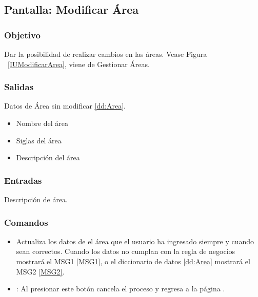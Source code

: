 \subsection{Pantalla: Modificar Área}

\subsubsection{Objetivo}
Dar la posibilidad de realizar cambios en las áreas. Vease Figura ~\ref{IUModificarArea}, viene de Gestionar Áreas.


\subsubsection{Salidas}
Datos de Área sin modificar \ref{dd:Area}.
\begin{itemize}
 \item Nombre del área
 \item Siglas del área
 \item Descripción del área
\end{itemize}
\subsubsection{Entradas}
Descripción de área.


\subsubsection{Comandos}
\begin{itemize}
 \item {} Actualiza los datos de el área que el usuario ha ingresado siempre y cuando sean correctos. Cuando los datos no cumplan con la regla de negocios   mostrará el MSG1 \ref{MSG1}, o el diccionario de datos \ref{dd:Area} mostrará el MSG2 \ref{MSG2}. 
 \item {}: Al presionar este botón cancela el proceso y regresa a la página .

\end{itemize}

